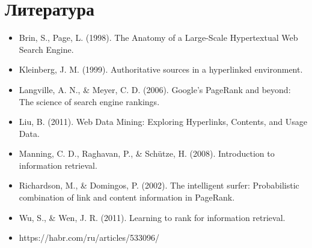 \documentclass[a4paper]{article}
\begin{document}
	\section{Литература}	
		\begin{itemize}
			\item Brin, S., Page, L. (1998). The Anatomy of a Large-Scale Hypertextual Web Search Engine.
			\item Kleinberg, J. M. (1999). Authoritative sources in a hyperlinked environment.
			\item Langville, A. N., \& Meyer, C. D. (2006). Google's PageRank and beyond: The science of search engine rankings.
			\item Liu, B. (2011). Web Data Mining: Exploring Hyperlinks, Contents, and Usage Data.
			\item Manning, C. D., Raghavan, P., \& Schütze, H. (2008). Introduction to information retrieval.
			\item Richardson, M., \& Domingos, P. (2002). The intelligent surfer: Probabilistic combination of link and content information in PageRank.
			\item Wu, S., \& Wen, J. R. (2011). Learning to rank for information retrieval.
			\item https://habr.com/ru/articles/533096/
		\end{itemize}	
\end{document}
